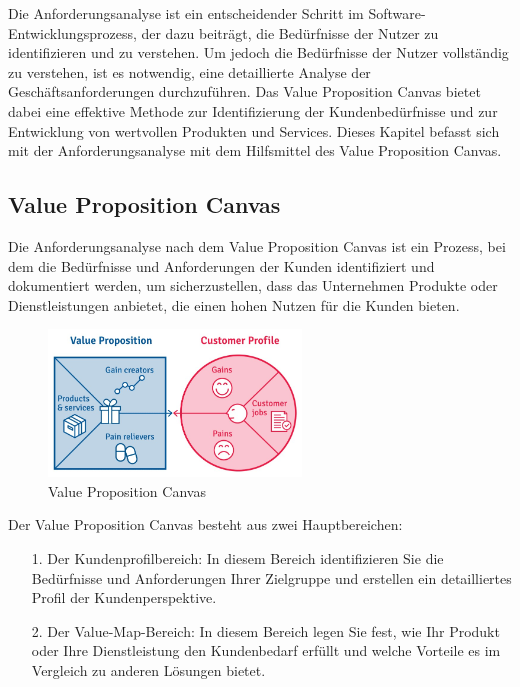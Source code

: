 
Die Anforderungsanalyse ist ein entscheidender Schritt im Software-Entwicklungsprozess, der dazu beiträgt, die Bedürfnisse der Nutzer zu identifizieren und zu verstehen. Um jedoch die Bedürfnisse der Nutzer vollständig zu verstehen, ist es notwendig, eine detaillierte Analyse der Geschäftsanforderungen durchzuführen. Das Value Proposition Canvas bietet dabei eine effektive Methode zur Identifizierung der Kundenbedürfnisse und zur Entwicklung von wertvollen Produkten und Services. Dieses Kapitel befasst sich mit der Anforderungsanalyse mit dem Hilfsmittel des Value Proposition Canvas.

\subsection{Value Proposition Canvas}

Die Anforderungsanalyse nach dem Value Proposition Canvas ist ein Prozess, bei dem die Bedürfnisse und Anforderungen der Kunden identifiziert und dokumentiert werden, um sicherzustellen, dass das Unternehmen Produkte oder Dienstleistungen anbietet, die einen hohen Nutzen für die Kunden bieten.

\begin{figure}
    \centering
    \includegraphics[width=0.6\textwidth]{figures/andre/valuepropositioncanvas.jpg}
    \caption{Value Proposition Canvas}
    \label{fig:valuepropositioncanvas}
\end{figure}

Der Value Proposition Canvas besteht aus zwei Hauptbereichen:

\begin{itemize}
    \item[1.]	Der Kundenprofilbereich: In diesem Bereich identifizieren Sie die Bedürfnisse und Anforderungen Ihrer Zielgruppe und erstellen ein detailliertes Profil der Kundenperspektive.
    \item[2.]	Der Value-Map-Bereich: In diesem Bereich legen Sie fest, wie Ihr Produkt oder Ihre Dienstleistung den Kundenbedarf erfüllt und welche Vorteile es im Vergleich zu anderen Lösungen bietet.
\end{itemize}

